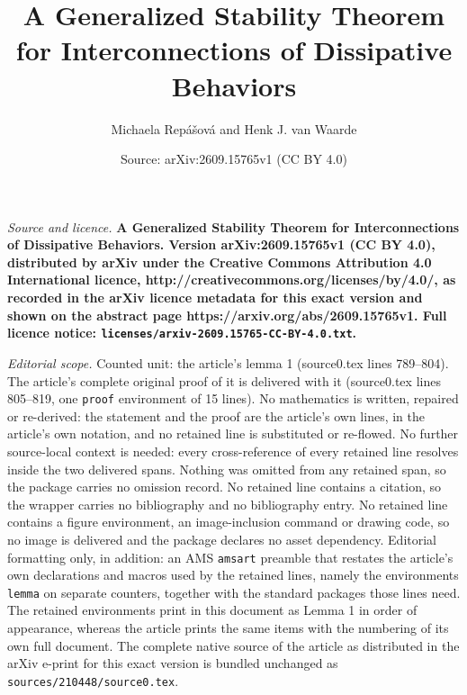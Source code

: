 \documentclass[10pt,a4paper]{amsart}
\title{\LARGE \bf A Generalized Stability Theorem for Interconnections of Dissipative Behaviors}
\author{Michaela Repášová and Henk J. van Waarde}
\date{Source: arXiv:2609.15765v1 (CC BY 4.0)}
\begin{document}
\maketitle

\noindent\emph{Source and licence.} \LARGE \bf A Generalized Stability Theorem for Interconnections of Dissipative Behaviors. Version arXiv:2609.15765v1 (CC BY 4.0), distributed by arXiv under the Creative Commons Attribution 4.0 International licence, http://creativecommons.org/licenses/by/4.0/, as recorded in the arXiv licence metadata for this exact version and shown on the abstract page https://arxiv.org/abs/2609.15765v1. Full licence notice: \texttt{licenses/arxiv-2609.15765-CC-BY-4.0.txt}.\par\smallskip

\noindent\textit{Editorial scope.} Counted unit: the article's lemma 1 (source0.tex lines 789--804). The article's complete original proof of it is delivered with it (source0.tex lines 805--819, one \texttt{proof} environment of 15 lines). No mathematics is written, repaired or re-derived: the statement and the proof are the article's own lines, in the article's own notation, and no retained line is substituted or re-flowed.  No further source-local context is needed: every cross-reference of every retained line resolves inside the two delivered spans.  Nothing was omitted from any retained span, so the package carries no omission record.  No retained line contains a citation, so the wrapper carries no bibliography and no bibliography entry.  No retained line contains a figure environment, an image-inclusion command or drawing code, so no image is delivered and the package declares no asset dependency.  Editorial formatting only, in addition: an AMS \texttt{amsart} preamble that restates the article's own declarations and macros used by the retained lines, namely the environments \texttt{lemma} on separate counters, together with the standard packages those lines need.  The retained environments print in this document as Lemma 1 in order of appearance, whereas the article prints the same items with the numbering of its own full document.  The complete native source of the article as distributed in the arXiv e-print for this exact version is bundled unchanged as \texttt{sources/210448/source0.tex}.
\end{document}
